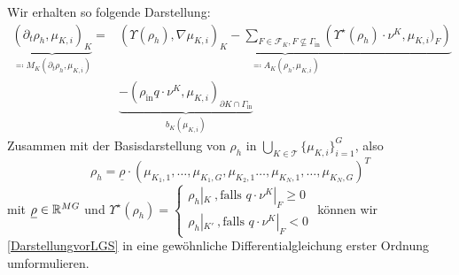 Wir erhalten so folgende Darstellung:
\begin{align}
\label{DarstellungvorLGS}
\underbrace{\left(\partial_t \rho_h, \mu_{K,i}  \right)_{K}}_{\eqqcolon M_K(\partial_t \rho_{h}, \mu_{K,i})} = 
&\underbrace{ \left(\Upsilon(\rho_h), \nabla\mu_{K,i}\right)_{K} -  \sum_{F \in \mathcal{F}_{K} , F \not \subseteq \Gamma_{\text{in}}}\left(\Upsilon^{\star}(\rho_h)\cdot \nu^{K},\mu_{K,i}\big)_F \right)}_{\eqqcolon A_K(\rho_{h},\mu_{K,i})} \nonumber \\ &\underbrace{- \left(\rho_{\text{in}}q\cdot \nu^{K},\mu_{K,i} \right)_{\partial K \cap \Gamma_{\text{in}}}}_{b_K(\mu_{K,i})}
\end{align}
%
Zusammen mit der Basisdarstellung von $ \rho_h $ in $\bigcup_{K \in \mathcal{T}}\{\mu_{K,i}  \}_{i=1}^G$, also 
\[ \rho_h = \underline{\rho} \cdot (\mu_{K_1,1},\dots,\mu_{K_1,G},\mu_{K_2,1}\dots,\mu_{K_N,1},\dots,\mu_{K_N,G})^T\]
mit $ \underline{\rho}\in \mathbb{R}^{MG} $ und 
$ \Upsilon^{\star}(\rho_h) = 
\begin{cases} 
\rho_h|_K \ ,\text{falls } q\cdot \nu^K|_F \geq 0\\
\rho_{h}|_{K'} \ , \text{falls } q\cdot \nu^K|_F < 0
\end{cases} 
$
 können wir \ref{DarstellungvorLGS} in eine gewöhnliche Differentialgleichung erster Ordnung umformulieren. 
